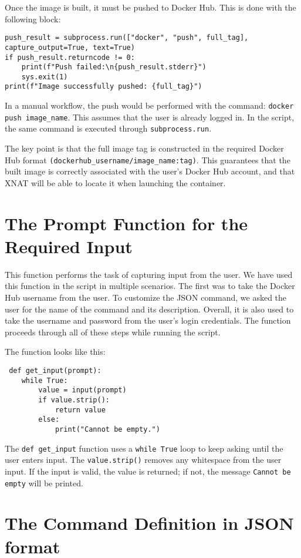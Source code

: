 Once the image is built, it must be pushed to Docker Hub. This is done with the following block:
\begin{lstlisting}
push_result = subprocess.run(["docker", "push", full_tag], capture_output=True, text=True)
if push_result.returncode != 0:
    print(f"Push failed:\n{push_result.stderr}")
    sys.exit(1)
print(f"Image successfully pushed: {full_tag}")

\end{lstlisting}
In a manual workflow, the push would be performed with the command:  \texttt{docker push image\_name}. This assumes that the user is already logged in. In the script, the same command is executed through  \texttt{subprocess.run}.

The key point is that the full image tag is constructed in the required Docker Hub format \texttt{(dockerhub\_username/image\_name:tag)}. This guarantees that the built image is correctly associated with the user’s Docker Hub account, and that XNAT will be able to locate it when launching the container.

\section{The Prompt Function for the Required Input}

This function performs the task of capturing input from the user.
We have used this function in the script in multiple scenarios. The first was to take the Docker Hub username from the user. To customize the JSON command, we asked the user for the name of the command and its description. Overall, it is also used to take the username and password from the user’s login credentials. The function proceeds through all of these steps while running the script.

The function looks like this:
 
 \begin{lstlisting}
 def get_input(prompt):
    while True:
        value = input(prompt)
        if value.strip():
            return value
        else:
            print("Cannot be empty.")

\end{lstlisting}
The \texttt{def get\_input} function uses a \texttt{while True} loop to keep asking until the user enters input. The \texttt{value.strip()} removes any whitespace from the user input. If the input is valid, the value is returned; if not, the message \texttt{Cannot be empty} will be printed.

\section{The Command Definition in JSON format}


